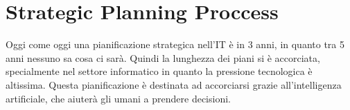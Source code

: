\section{Strategic Planning Proccess}

Oggi come oggi una pianificazione strategica nell'IT è in 3 anni, in quanto tra 
5 anni nessuno sa cosa ci sarà. Quindi la lunghezza dei piani si è accorciata, 
specialmente nel settore informatico in quanto la pressione tecnologica è 
altissima. Questa pianificazione è destinata ad accorciarsi grazie 
all'intelligenza artificiale, che aiuterà gli umani a prendere decisioni.
